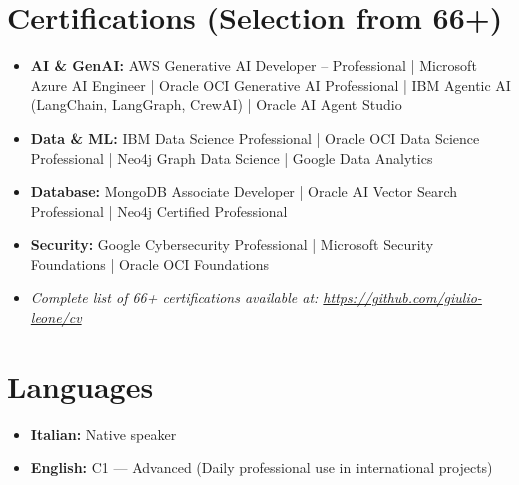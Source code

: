 \documentclass[11pt, letterpaper]{article}
\begin{document}
\section*{Certifications (Selection from 66+)}
\begin{itemize}
    \item \textbf{AI \& GenAI:} AWS Generative AI Developer -- Professional | Microsoft Azure AI Engineer | Oracle OCI Generative AI Professional | IBM Agentic AI (LangChain, LangGraph, CrewAI) | Oracle AI Agent Studio
    \item \textbf{Data \& ML:} IBM Data Science Professional | Oracle OCI Data Science Professional | Neo4j Graph Data Science | Google Data Analytics
    \item \textbf{Database:} MongoDB Associate Developer | Oracle AI Vector Search Professional | Neo4j Certified Professional
    \item \textbf{Security:} Google Cybersecurity Professional | Microsoft Security Foundations | Oracle OCI Foundations
    \item \textit{Complete list of 66+ certifications available at: \url{https://github.com/giulio-leone/cv}}
\end{itemize}

\section*{Languages}
\begin{itemize}
    \item \textbf{Italian:} Native speaker
    \item \textbf{English:} C1 --- Advanced (Daily professional use in international projects)
\end{itemize}
\end{document}

